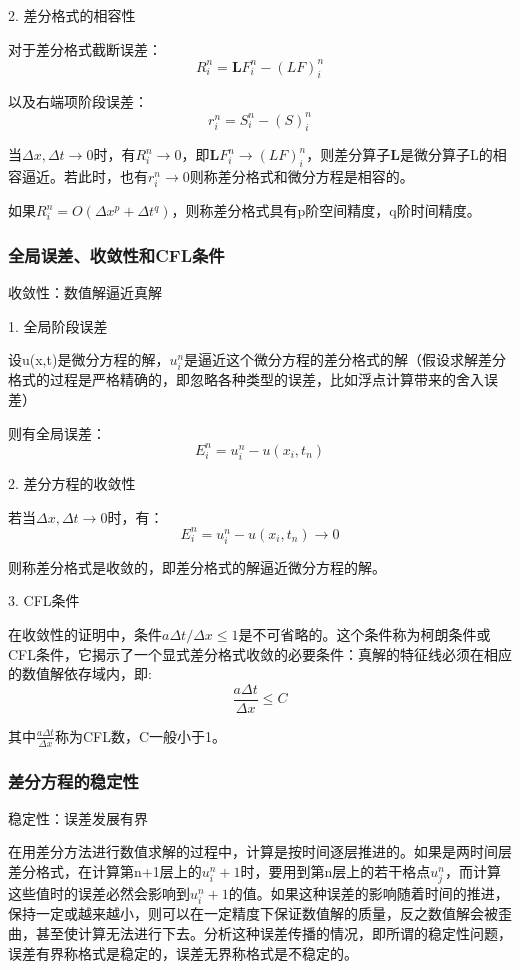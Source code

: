 \documentclass{article}
\begin{document}
2. 差分格式的相容性

对于差分格式截断误差：$$R_i^n = \mathbf{L}F_i^n-(LF)_i^n$$

以及右端项阶段误差：$$r_i^n =  S_i^n-(S)_i^n$$

当$\Delta x, \Delta t \longrightarrow 0$时，有$R_i^n\longrightarrow0$，即$\mathbf{L}F_i^n\longrightarrow(LF)_i^n$，则差分算子$\mathbf{L}$是微分算子L的相容逼近。若此时，也有$r_i^n\longrightarrow0$则称差分格式和微分方程是相容的。

如果$R_i^n=O(\Delta x^p + \Delta t^q)$，则称差分格式具有p阶空间精度，q阶时间精度。

\subsubsection{全局误差、收敛性和CFL条件}
收敛性：数值解逼近真解

1. 全局阶段误差

设u(x,t)是微分方程的解，$u_i^n$是逼近这个微分方程的差分格式的解（假设求解差分格式的过程是严格精确的，即忽略各种类型的误差，比如浮点计算带来的舍入误差）

则有全局误差：
$$E_i^n = u^n_i - u(x_i, t_n)$$

2. 差分方程的收敛性

若当$\Delta x,\Delta t\longrightarrow0$时，有：
$$E_i^n = u^n_i - u(x_i, t_n)\longrightarrow0$$

则称差分格式是收敛的，即差分格式的解逼近微分方程的解。

3. CFL条件

在收敛性的证明中，条件$a\Delta t/\Delta x\le1$是不可省略的。这个条件称为柯朗条件或CFL条件，它揭示了一个显式差分格式收敛的必要条件：真解的特征线必须在相应的数值解依存域内，即:
$$\frac{a\Delta t}{\Delta x}\le C$$

其中$\frac{a\Delta t}{\Delta x}$称为CFL数，C一般小于1。

\subsubsection{差分方程的稳定性}
稳定性：误差发展有界

在用差分方法进行数值求解的过程中，计算是按时间逐层推进的。如果是两时间层差分格式，在计算第n+1层上的$u_i^n+1$时，要用到第n层上的若干格点$u_j^n$，而计算这些值时的误差必然会影响到$u_i^n+1$的值。如果这种误差的影响随着时间的推进，保持一定或越来越小，则可以在一定精度下保证数值解的质量，反之数值解会被歪曲，甚至使计算无法进行下去。分析这种误差传播的情况，即所谓的稳定性问题，误差有界称格式是稳定的，误差无界称格式是不稳定的。
\end{document}
